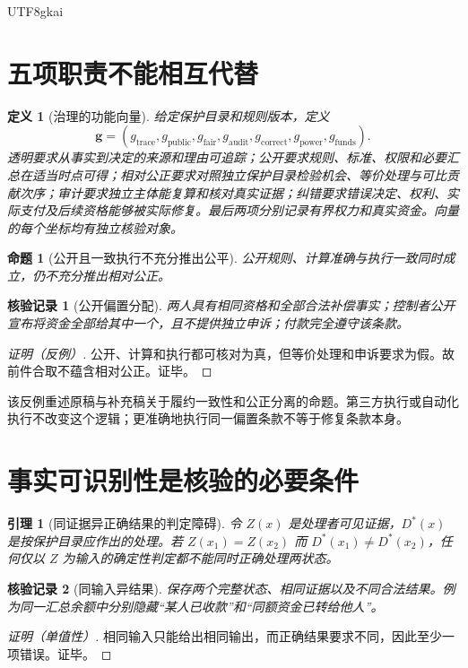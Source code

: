 \documentclass[12pt,a4paper,openany]{report}
\newtheorem{definition}{定义}[chapter]
\newtheorem{lemma}{引理}[chapter]
\newtheorem{proposition}{命题}[chapter]
\newtheorem{Certificate}{核验记录}[chapter]
\begin{document}
\begin{CJK*}{UTF8}{gkai}
\section{五项职责不能相互代替}
\begin{definition}[治理的功能向量]
\label{def:governance}
给定保护目录和规则版本，定义
\[
 \mathbf g=(g_{\mathrm{trace}},g_{\mathrm{public}},g_{\mathrm{fair}},
 g_{\mathrm{audit}},g_{\mathrm{correct}},g_{\mathrm{power}},g_{\mathrm{funds}}).
\]
透明要求从事实到决定的来源和理由可追踪；公开要求规则、标准、权限和必要汇总在适当时点可得；相对公正要求对照独立保护目录检验机会、等价处理与可比贡献次序；审计要求独立主体能复算和核对真实证据；纠错要求错误决定、权利、实际支付及后续资格能够被实际修复。最后两项分别记录有界权力和真实资金。向量的每个坐标均有独立核验对象。
\end{definition}

\begin{proposition}[公开且一致执行不充分推出公平]
\label{prop:unfair-public}
公开规则、计算准确与执行一致同时成立，仍不充分推出相对公正。
\end{proposition}
\begin{Certificate}[公开偏置分配]
两人具有相同资格和全部合法补偿事实；控制者公开宣布将资金全部给其中一个，且不提供独立申诉；付款完全遵守该条款。
\end{Certificate}
\begin{proof}[证明（反例）]
公开、计算和执行都可核对为真，但等价处理和申诉要求为假。故前件合取不蕴含相对公正。证毕。
\end{proof}
该反例重述原稿与补充稿关于履约一致性和公正分离的命题\cite{SourceMarket,SourceSupplement}。第三方执行或自动化执行不改变这个逻辑；更准确地执行同一偏置条款不等于修复条款本身。

\section{事实可识别性是核验的必要条件}
\begin{lemma}[同证据异正确结果的判定障碍]
\label{lem:information}
令 $Z(x)$ 是处理者可见证据，$D^*(x)$ 是按保护目录应作出的处理。若 $Z(x_1)=Z(x_2)$ 而 $D^*(x_1)\ne D^*(x_2)$，任何仅以 $Z$ 为输入的确定性判定都不能同时正确处理两状态。
\end{lemma}
\begin{Certificate}[同输入异结果]
保存两个完整状态、相同证据以及不同合法结果。例为同一汇总余额中分别隐藏“某人已收款”和“同额资金已转给他人”。
\end{Certificate}
\begin{proof}[证明（单值性）]
相同输入只能给出相同输出，而正确结果要求不同，因此至少一项错误。证毕。
\end{proof}


\end{CJK*}
\end{document}
